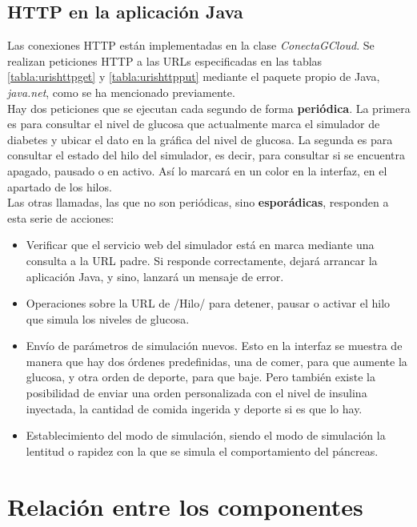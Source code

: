 \documentclass[12pt,spanish,listoffigures,listoftables]{tfgetsinf}
\begin{document}
\section{HTTP en la aplicación Java}

Las conexiones HTTP están implementadas en la clase \textit{ConectaGCloud}. Se realizan peticiones HTTP a las URLs especificadas en las tablas \ref{tabla:urishttpget} y \ref{tabla:urishttpput} mediante el paquete propio de Java, \textit{java.net}, como se ha mencionado previamente.\\

Hay dos peticiones que se ejecutan cada segundo de forma \textbf{periódica}. La primera es para consultar el nivel de glucosa que actualmente marca el simulador de diabetes y ubicar el dato en la gráfica del nivel de glucosa. La segunda es para consultar el estado del hilo del simulador, es decir, para consultar si se encuentra apagado, pausado o en activo. Así lo marcará en un color en la interfaz, en el apartado de los hilos. \\

Las otras llamadas, las que no son periódicas, sino \textbf{esporádicas}, responden a esta serie de acciones:
\begin{itemize}
	\item Verificar que el servicio web del simulador está en marca mediante una consulta a la URL padre. Si responde correctamente, dejará arrancar la aplicación Java, y sino, lanzará un mensaje de error.
	\item Operaciones sobre la URL de /Hilo/ para detener, pausar o activar el hilo que simula los niveles de glucosa.
	\item Envío de parámetros de simulación nuevos. Esto en la interfaz se muestra de manera que hay dos órdenes predefinidas, una de comer, para que aumente la glucosa, y otra orden de deporte, para que baje. Pero también existe la posibilidad de enviar una orden personalizada con el nivel de insulina inyectada, la cantidad de comida ingerida y deporte si es que lo hay.
	\item Establecimiento del modo de simulación, siendo el modo de simulación la lentitud o rapidez con la que se simula el comportamiento del páncreas.
\end{itemize}

\chapter{Relación entre los componentes}
\end{document}
